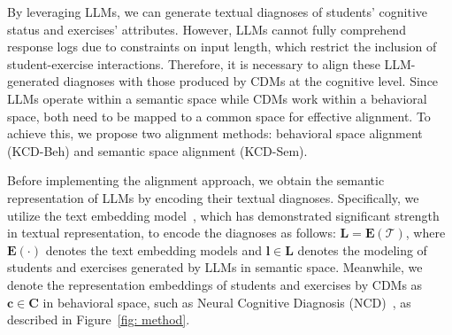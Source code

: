 

By leveraging LLMs, we can generate textual diagnoses of students' cognitive status and exercises' attributes. 
However, LLMs cannot fully comprehend response logs due to constraints on input length, which restrict the inclusion of student-exercise interactions.
Therefore, it is necessary to align these LLM-generated diagnoses with those produced by CDMs at the cognitive level. 
Since LLMs operate within a semantic space while CDMs work within a behavioral space, both need to be mapped to a common space for effective alignment. To achieve this, we propose two alignment methods: behavioral space alignment (KCD-Beh) and semantic space alignment (KCD-Sem).

Before implementing the alignment approach, we obtain the semantic representation of LLMs by encoding their textual diagnoses. Specifically, we utilize the text embedding model~\cite{su2023one}, which has demonstrated significant strength in textual representation, to encode the diagnoses as follows: $\mathbf{L}=\mathbf{E}(\mathcal{T})$,
where $\mathbf{E}(\cdot)$ denotes the text embedding models and $\mathbf{l}\in\mathbf{L}$ denotes the modeling of students and exercises generated by LLMs in semantic space. Meanwhile, we denote the representation embeddings of students and exercises by CDMs as $\mathbf{c}\in\mathbf{C}$ in behavioral space, such as Neural Cognitive Diagnosis (NCD)~\cite{wang2020neural}, as described in Figure~\ref{fig: method}.




